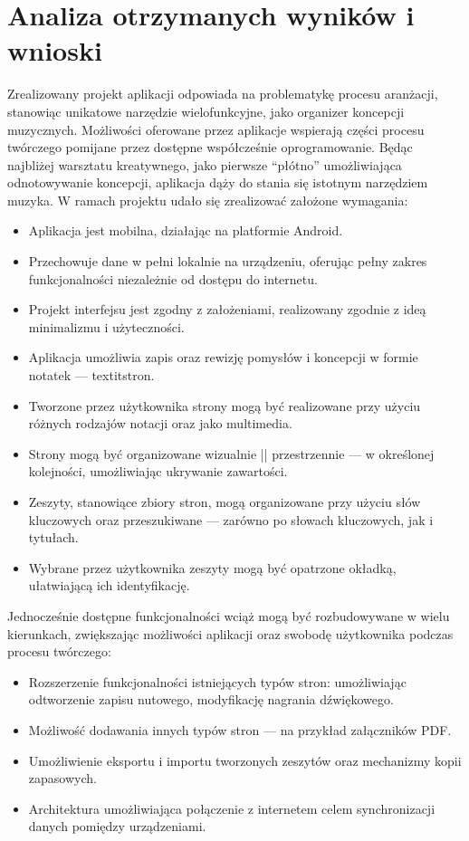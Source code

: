 \documentclass[12pt]{article}
\begin{document}
\section{Analiza otrzymanych wyników i wnioski}
Zrealizowany projekt aplikacji odpowiada na problematykę procesu aranżacji, stanowiąc unikatowe narzędzie wielofunkcyjne,
jako organizer koncepcji muzycznych. Możliwości oferowane przez aplikacje wspierają części procesu twórczego pomijane przez
dostępne współcześnie oprogramowanie. Będąc najbliżej warsztatu kreatywnego, jako pierwsze \enquote{płótno}
umożliwiająca odnotowywanie koncepcji, aplikacja dąży do stania się istotnym narzędziem muzyka.
W ramach projektu udało się zrealizować założone wymagania:
\begin{itemize}
	\item Aplikacja jest mobilna, działając na platformie Android.
	\item Przechowuje dane w pełni lokalnie na urządzeniu, oferując pełny zakres funkcjonalności niezależnie od dostępu do internetu.
	\item Projekt interfejsu jest zgodny z założeniami, realizowany zgodnie z ideą minimalizmu i użyteczności.
	\item Aplikacja umożliwia zapis oraz rewizję pomysłów i koncepcji w formie notatek — textit{stron}.
	\item Tworzone przez użytkownika strony mogą być realizowane przy użyciu różnych rodzajów notacji oraz jako multimedia.
	\item Strony mogą być organizowane wizualnie || przestrzennie — w określonej kolejności, umożliwiając ukrywanie zawartości.
	\item Zeszyty, stanowiące zbiory stron, mogą organizowane przy użyciu słów kluczowych oraz przeszukiwane — zarówno po słowach kluczowych, jak i tytułach.
	\item Wybrane przez użytkownika zeszyty mogą być opatrzone okładką, ułatwiającą ich identyfikację.
\end{itemize}

Jednocześnie dostępne funkcjonalności wciąż mogą być rozbudowywane w wielu kierunkach,
zwiększając możliwości aplikacji oraz swobodę użytkownika podczas procesu twórczego:
\begin{itemize}
	\item Rozszerzenie funkcjonalności istniejących typów stron: umożliwiając odtworzenie zapisu nutowego, modyfikację nagrania dźwiękowego.
	\item Możliwość dodawania innych typów stron — na przykład załączników PDF.
	\item Umożliwienie eksportu i importu tworzonych zeszytów oraz mechanizmy kopii zapasowych.
	\item Architektura umożliwiająca połączenie z internetem celem synchronizacji danych pomiędzy urządzeniami.
\end{itemize}
\end{document}
